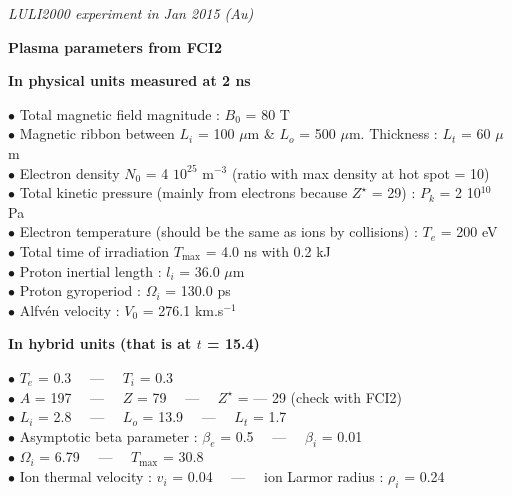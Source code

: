 \documentclass{report}
\begin{document}
{\it
LULI2000 experiment in Jan 2015 (Au)}

\bigskip

\begin{center}
{\large
\bf
Plasma parameters from FCI2\\[0.2cm]
}
{\it }
\end{center}

\bigskip

{\bf In physical units measured at 2 ns}

\smallskip

$\bullet$ Total magnetic field magnitude : $B_0$ = 80 T \\
$\bullet$ Magnetic ribbon between $L_i$ = 100 $\mu$m \& $L_o$ = 500 $\mu$m. Thickness : $L_t$ = 60 $\mu$m \\
$\bullet$ Electron density $N_0$ = 4 $10^{25}$ m$^{-3}$ (ratio with max density at hot spot = 10) \\
$\bullet$ Total kinetic pressure (mainly from electrons because $Z^{\star}$ = 29) : $P_k$ = 2 10$^{10}$ Pa \\
$\bullet$ Electron temperature (should be the same as ions by collisions) : $T_e$ = 200 eV \\
$\bullet$ Total time of irradiation $T_{\max}$ = 4.0 ns with 0.2 kJ \\
$\bullet$ Proton inertial length : $l_i$ = 36.0 $\mu$m \\
$\bullet$ Proton gyroperiod : $\Omega_i$ = 130.0 ps \\
$\bullet$ Alfvén velocity : $V_0$ = 276.1 km.s$^{-1}$ \\

\medskip

{\bf In hybrid units (that is at $t$ = 15.4)}

\smallskip

$\bullet$ $T_e$ = 0.3 \ \ --- \ \ $T_i$ = 0.3 \\
$\bullet$ $A$ = 197 \ \ --- \ \ $Z$ = 79 \ \ --- \ \ $Z^{\star}$ = --- 29 (check with FCI2)\\
$\bullet$ $L_i$ = 2.8 \ \ --- \ \ $L_o$ = 13.9 \ \ --- \ \ $L_t$ = 1.7 \\
$\bullet$ Asymptotic beta parameter : $\beta_e$ = 0.5 \ \ --- \ \ $\beta_i$ = 0.01 \\
$\bullet$ $\Omega_i$ = 6.79 \ \ --- \ \ $T_{\max}$ = 30.8 \\
$\bullet$ Ion thermal velocity : $v_i$ = 0.04 \ \ --- \ \ ion Larmor radius : $\rho_i$ = 0.24 \\
\end{document}
